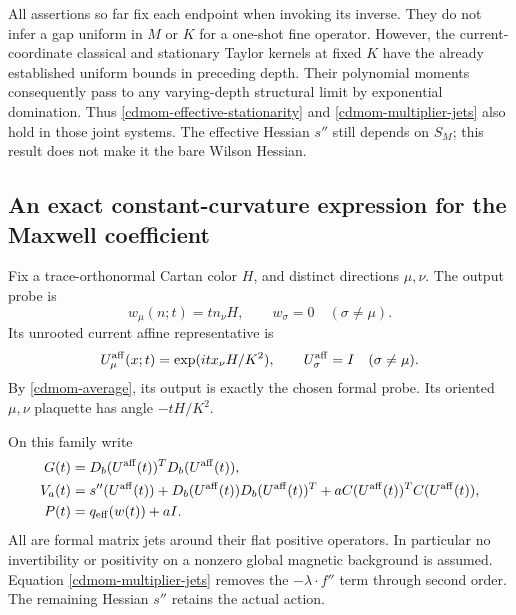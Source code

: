 \documentclass[11pt]{article}
\theoremstyle{remark}
\begin{document}
All assertions so far fix each endpoint when invoking
its inverse. They do not infer a gap uniform in \(M\)
or \(K\) for a one-shot fine operator. However, the
current-coordinate classical and stationary Taylor
kernels at fixed \(K\) have the already established
uniform bounds in preceding depth. Their polynomial
moments consequently pass to any varying-depth
structural limit by exponential domination.
Thus \eqref{cdmom-effective-stationarity} and
\eqref{cdmom-multiplier-jets} also hold in those joint
systems. The effective Hessian \(s''\) still depends
on \(S_M\); this result does not make it the bare
Wilson Hessian.

\subsection{An exact constant-curvature expression for the Maxwell coefficient}
\label{cdmom-determinant-section}

Fix a trace-orthonormal Cartan color \(H\), and distinct
directions \(\mu,\nu\). The output probe is
\[
 w_\mu(n;t)=t n_\nu H,\qquad w_\sigma=0\quad(\sigma\ne\mu).
\]
Its unrooted current affine representative is
\begin{equation}
 U_\mu^{\rm aff}(x;t)=\exp(i t x_\nu H/K^2),\qquad
 U_\sigma^{\rm aff}=I\quad(\sigma\ne\mu).
 \label{cdmom-probe}
\end{equation}
By \eqref{cdmom-average}, its output is exactly the
chosen formal probe. Its oriented \(\mu,\nu\) plaquette
has angle \(-tH/K^2\).

On this family write
\begin{align}
 G(t)&=D_b(U^{\rm aff}(t))^TD_b(U^{\rm aff}(t)),\notag\\
 V_a(t)&=s''(U^{\rm aff}(t))
           +D_b(U^{\rm aff}(t))D_b(U^{\rm aff}(t))^T
           +aC(U^{\rm aff}(t))^TC(U^{\rm aff}(t)),\notag\\
 P(t)&=q_{\rm eff}(w(t))+aI.
 \label{cdmom-probe-matrices}
\end{align}
All are formal matrix jets around their flat positive
operators. In particular no invertibility or positivity
on a nonzero global magnetic background is assumed.
Equation \eqref{cdmom-multiplier-jets} removes the
\(-\lambda\cdot f''\) term through second order.
The remaining Hessian \(s''\) retains the actual action.
\end{document}
